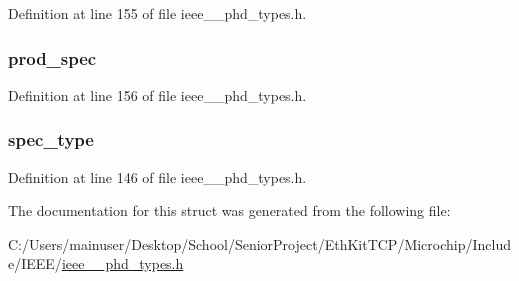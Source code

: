 Definition at line 155 of file ieee\+\_\+\_\+phd\+\_\+types.\+h.

\hypertarget{struct___prod_spec_entry_aa71966d0c6b26c6063fe114ae02e9a9a}{}
\subsubsection[{prod\+\_\+spec}]{ prod\+\_\+spec}\label{struct___prod_spec_entry_aa71966d0c6b26c6063fe114ae02e9a9a}


Definition at line 156 of file ieee\+\_\+\_\+phd\+\_\+types.\+h.

\hypertarget{struct___prod_spec_entry_a143d17b9a4e6eba50de309f8324f1083}{}
\subsubsection[{spec\+\_\+type}]{ spec\+\_\+type}\label{struct___prod_spec_entry_a143d17b9a4e6eba50de309f8324f1083}


Definition at line 146 of file ieee\+\_\+\_\+phd\+\_\+types.\+h.



The documentation for this struct was generated from the following file\+:\begin{DoxyCompactItemize}
\item 
C\+:/\+Users/mainuser/\+Desktop/\+School/\+Senior\+Project/\+Eth\+Kit\+T\+C\+P/\+Microchip/\+Include/\+I\+E\+E\+E/\hyperlink{ieee__11073__phd__types_8h}{ieee\+\_\+\_\+phd\+\_\+types.\+h}\end{DoxyCompactItemize}
